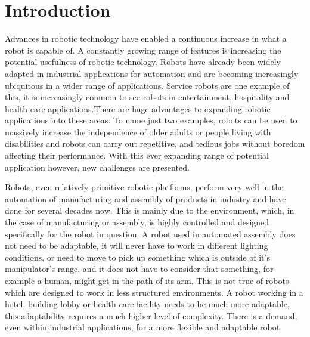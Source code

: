 

\chapter{Introduction}
Advances in robotic technology have enabled a continuous increase in what a robot is capable of. A constantly growing range of features is increasing the potential usefulness of robotic technology. Robots have already been widely adapted in industrial applications for automation and are becoming increasingly ubiquitous in a wider range of applications. Service robots are one example of this, it is increasingly common to see robots in entertainment, hospitality and health care applications.There are huge advantages to expanding robotic applications into these areas. To name just two examples, robots can be used to massively increase the independence of older adults or people living with disabilities and robots can carry out repetitive, and tedious jobs without boredom affecting their performance. With this ever expanding range of potential application however, new challenges are presented. 


Robots, even relatively primitive robotic platforms, perform very well in the automation of manufacturing and assembly of products in industry and have done for several decades now. This is mainly due to the environment, which, in the case of manufacturing or assembly, is highly controlled and designed specifically for the robot in question. A robot used in automated assembly does not need to be adaptable, it will never have to work in different lighting conditions, or need to move to pick up something which is outside of it's manipulator's range, and it does not have to consider that something, for example a human, might get in the path of its arm. This is not true of robots which are designed to work in less structured environments. A robot working in a hotel, building lobby or health care facility needs to be much more adaptable, this adaptability requires a much higher level of complexity. There is a demand, even within industrial applications, for a more flexible and adaptable robot.  

